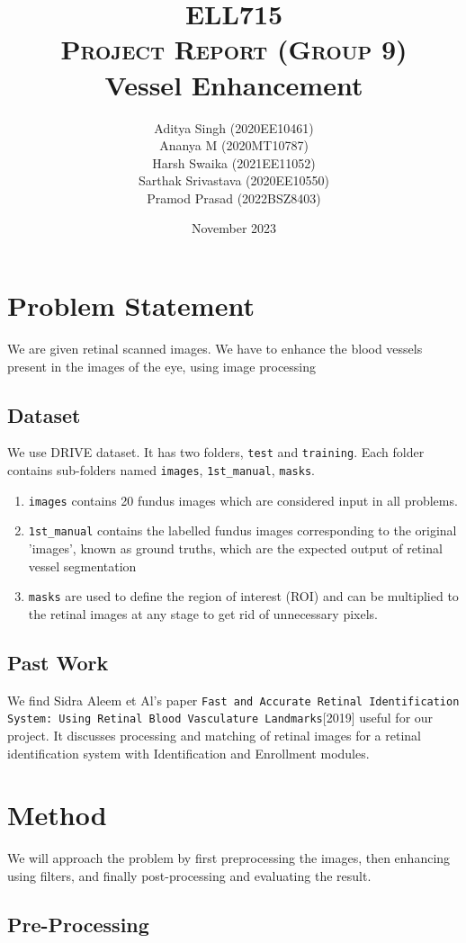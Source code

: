 \documentclass{article}
\title{\textbf{ELL715}\\
\textsc{Project Report (Group 9)} \\ Vessel Enhancement}
\author{
Aditya Singh (2020EE10461) \\
Ananya M (2020MT10787)\\
Harsh Swaika (2021EE11052)\\
Sarthak Srivastava (2020EE10550)\\
Pramod Prasad (2022BSZ8403)
}
\date{November 2023}
\begin{document}
\maketitle

\section{Problem Statement}
We are given retinal scanned images. We have to enhance the blood vessels present in the images of the eye, using image processing

\subsection{Dataset}
We use DRIVE dataset.
It has two folders, \texttt{test} and \texttt{training}. Each folder contains sub-folders named \texttt{images}, \texttt{1st\_manual}, \texttt{masks}.
\begin{enumerate}
    \item \texttt{images} contains 20 fundus images which are considered input in all problems.
    \item  \texttt{1st\_manual} contains the labelled fundus images corresponding to the original ’images’, known as ground truths, which are the expected output of retinal vessel segmentation
    \item  \texttt{masks} are used to define the region of interest (ROI) and can be multiplied to the retinal images at any stage to get rid of unnecessary pixels.
\end{enumerate}

\subsection{Past Work}
We find Sidra Aleem et Al's paper \texttt{Fast and Accurate Retinal Identification System: Using Retinal Blood Vasculature Landmarks}[2019] useful for our project. It discusses processing and matching of retinal images for a retinal identification system with Identification and Enrollment modules.

\clearpage
\section{Method}
We will approach the problem by first preprocessing the images, then enhancing using filters, and finally post-processing and evaluating the result.
\subsection{Pre-Processing}
\end{document}
